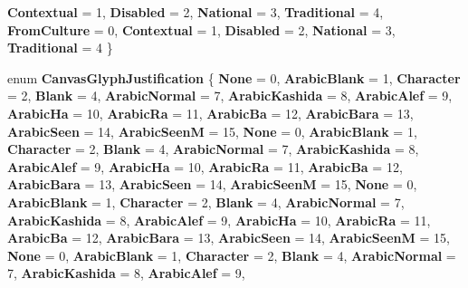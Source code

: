 \begin{DoxyCompactItemize}
{\bfseries Contextual} = 1, 
{\bfseries Disabled} = 2, 
{\bfseries National} = 3, 
{\bfseries Traditional} = 4, 
\newline
{\bfseries From\+Culture} = 0, 
{\bfseries Contextual} = 1, 
{\bfseries Disabled} = 2, 
{\bfseries National} = 3, 
\newline
{\bfseries Traditional} = 4
 \}
\item 
\mbox{\label{namespace_microsoft_1_1_graphics_1_1_canvas_1_1_text_acba5660b438dcb959c71962388688034}} 
enum {\bfseries Canvas\+Glyph\+Justification} \{ \newline
{\bfseries None} = 0, 
{\bfseries Arabic\+Blank} = 1, 
{\bfseries Character} = 2, 
{\bfseries Blank} = 4, 
\newline
{\bfseries Arabic\+Normal} = 7, 
{\bfseries Arabic\+Kashida} = 8, 
{\bfseries Arabic\+Alef} = 9, 
{\bfseries Arabic\+Ha} = 10, 
\newline
{\bfseries Arabic\+Ra} = 11, 
{\bfseries Arabic\+Ba} = 12, 
{\bfseries Arabic\+Bara} = 13, 
{\bfseries Arabic\+Seen} = 14, 
\newline
{\bfseries Arabic\+SeenM} = 15, 
{\bfseries None} = 0, 
{\bfseries Arabic\+Blank} = 1, 
{\bfseries Character} = 2, 
\newline
{\bfseries Blank} = 4, 
{\bfseries Arabic\+Normal} = 7, 
{\bfseries Arabic\+Kashida} = 8, 
{\bfseries Arabic\+Alef} = 9, 
\newline
{\bfseries Arabic\+Ha} = 10, 
{\bfseries Arabic\+Ra} = 11, 
{\bfseries Arabic\+Ba} = 12, 
{\bfseries Arabic\+Bara} = 13, 
\newline
{\bfseries Arabic\+Seen} = 14, 
{\bfseries Arabic\+SeenM} = 15, 
{\bfseries None} = 0, 
{\bfseries Arabic\+Blank} = 1, 
\newline
{\bfseries Character} = 2, 
{\bfseries Blank} = 4, 
{\bfseries Arabic\+Normal} = 7, 
{\bfseries Arabic\+Kashida} = 8, 
\newline
{\bfseries Arabic\+Alef} = 9, 
{\bfseries Arabic\+Ha} = 10, 
{\bfseries Arabic\+Ra} = 11, 
{\bfseries Arabic\+Ba} = 12, 
\newline
{\bfseries Arabic\+Bara} = 13, 
{\bfseries Arabic\+Seen} = 14, 
{\bfseries Arabic\+SeenM} = 15, 
{\bfseries None} = 0, 
\newline
{\bfseries Arabic\+Blank} = 1, 
{\bfseries Character} = 2, 
{\bfseries Blank} = 4, 
{\bfseries Arabic\+Normal} = 7, 
\newline
{\bfseries Arabic\+Kashida} = 8, 
{\bfseries Arabic\+Alef} = 9, 

\end{DoxyCompactItemize}
